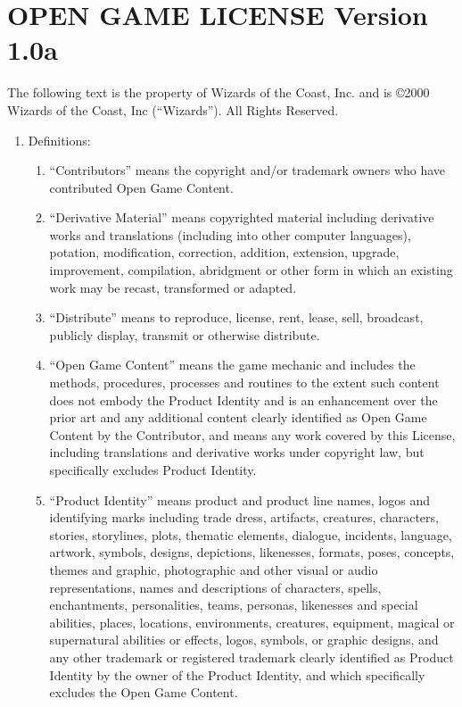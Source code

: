\chapter[OPEN GAME LICENSE]{OPEN GAME LICENSE Version 1.0a}\label{sec:OGL}

{\raggedright
The following text is the property of Wizards of the Coast, Inc.  and is \copyright 2000 Wizards of the Coast, Inc (``Wizards''). All Rights Reserved.

\begin{enumerate}
\item

Definitions:
\begin{enumerate}
\item
``Contributors'' means the copyright and/or trademark owners who have contributed Open Game Content.
\item
``Derivative Material'' means copyrighted material including derivative works and translations (including into other computer languages), potation, modification, correction, addition, extension, upgrade, improvement, compilation, abridgment or other form in which an existing work may be recast, transformed or adapted.
\item
``Distribute'' means to reproduce, license, rent, lease, sell, broadcast, publicly display, transmit or otherwise distribute.
\item
``Open Game Content'' means the game mechanic and includes the methods, procedures, processes and routines to the extent such content does not embody the Product Identity and is an enhancement over the prior art and any additional content clearly identified as Open Game Content by the Contributor, and means any work covered by this License, including translations and derivative works under copyright law, but specifically excludes Product Identity.
\item
``Product Identity'' means product and product line names, logos and identifying marks including trade dress, artifacts, creatures, characters, stories, storylines, plots, thematic elements, dialogue, incidents, language, artwork, symbols, designs, depictions, likenesses, formats, poses, concepts, themes and graphic, photographic and other visual or audio representations, names and descriptions of characters, spells, enchantments, personalities, teams, personas, likenesses and special abilities, places, locations, environments, creatures, equipment, magical or supernatural abilities or effects, logos, symbols, or graphic designs, and any other trademark or registered trademark clearly identified as Product Identity by the owner of the Product Identity, and which specifically excludes the Open Game Content.

\end{enumerate}
\end{enumerate}}
